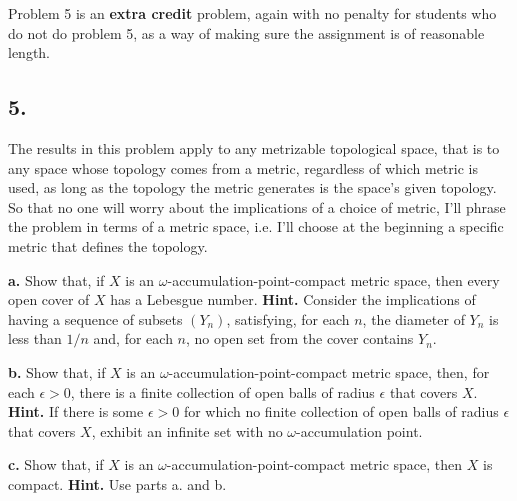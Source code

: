 \documentclass{amsart}
\theoremstyle{plain}
\theoremstyle{definition}
\theoremstyle{remark}
\begin{document}
\vspace{.15in}
Problem 5 is an {\bf extra credit} problem, again with no penalty for students who do not do problem 5, as a way of making sure the assignment is of reasonable length.
 
\vspace{.15in}
\noindent
\subsection*{5.} The results in this problem apply to any metrizable topological space, that is to any space whose topology comes from a metric, regardless of which metric is used, as long as the topology the metric generates is the space's given topology. So that no one will worry about the implications of a choice of metric, I'll phrase the problem in terms of a metric space, i.e. I'll choose at the beginning a specific metric that defines the topology.  

\vspace{.1in}
\noindent
{\bfseries a.} Show that, if $X$ is an $\omega$-accumulation-point-compact metric space, then every open cover of $X$ has a Lebesgue number. {\bfseries Hint.} Consider the implications of having a sequence of subsets $(Y_n)$, satisfying, for each $n$, the diameter of $Y_n$ is less than $1/n$ and, for each $n$, no open set from the cover contains $Y_n$.  

\vspace{.1in}
\noindent
{\bfseries b.} Show that, if $X$ is an $\omega$-accumulation-point-compact metric space, then, for each $\epsilon > 0$, there is a finite collection of open balls of radius $\epsilon$ that covers $X$. {\bfseries Hint.} If there is some $\epsilon > 0$ for which no finite collection of open balls of radius $\epsilon$ that covers $X$, exhibit an infinite set with no $\omega$-accumulation point.

\vspace{.1in}
\noindent
{\bfseries c.} Show that, if $X$ is an $\omega$-accumulation-point-compact metric space, then $X$ is compact. {\bfseries Hint.} Use parts a. and b. 


 
\end{document}
